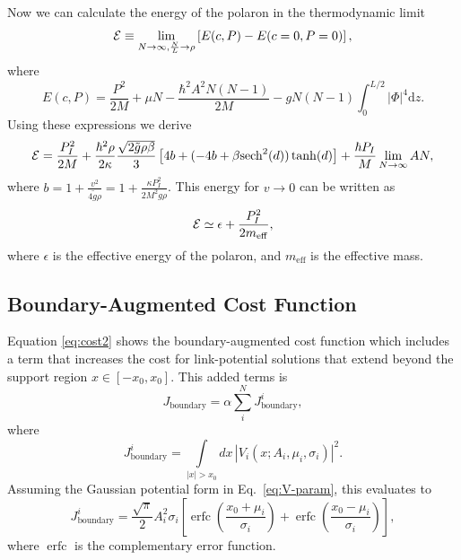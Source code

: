 \documentclass[twocolumn,amsmath,amssymb,showpacs,prl,superscriptaddress,aps]{revtex4-1}
\DeclareMathOperator\erfc{erfc}
\begin{document}
Now we can calculate the energy of the polaron in the thermodynamic limit
\begin{equation}
{\cal E}\equiv \lim_{N\to\infty, \frac{N}{L}\to \rho}\left[E(c,P)-E(c=0,P=0)\right],
\end{equation}
where
\begin{equation}
E(c,P) = \frac{P^2}{2M} + \mu N-\frac{\hbar^2 A^2 N(N-1)}{2M}-gN(N-1)\int_{0}^{L/2}|\Phi|^4\mathrm{d}z.
\end{equation}
Using these expressions we derive 
\begin{equation}
{\cal E}=\frac{P_I^2}{2M}+\frac{\hbar^2\rho}{2\kappa}\frac{\sqrt{2 \tilde g \rho \beta}}{3}\left[4 b + (-4b+\beta\mathrm{sech}^2(d))\tanh(d)\right]+\frac{\hbar P_I}{M}\lim_{N\to\infty} A N,
\end{equation}
where $b=1+\frac{v^2}{4\tilde g\rho}=1+\frac{\kappa P_I^2}{2M^2 g\rho}$. This energy for $v\to 0$ can be written as 
\begin{equation}
{\cal E}\simeq \epsilon+ \frac{P_I^2}{2m_{\mathrm{\mathrm{eff}}}},
\end{equation}
where $\epsilon$ is the effective energy of the polaron, and $m_{\mathrm{eff}}$ is the effective mass.





\subsection{Boundary-Augmented Cost Function}\label{sec:Jaug}
Equation \eqref{eq:cost2} shows the boundary-augmented cost function which includes a term that increases the cost for link-potential solutions that extend beyond the support region $x\in[-x_0,x_0]$. This added terms is
\begin{equation}
  J_{\mathrm{boundary}} = \alpha \sum_i^N J_{\mathrm{boundary}}^i,
\end{equation}
where 
\begin{equation}\label{eq:Jboundaryi}
  J_{\mathrm{boundary}}^i = \int\limits_{|x|>x_0}dx\,|V_i(x; A_i,\mu_i,\sigma_i)|^2.
\end{equation}
Assuming the Gaussian potential form in Eq.~\eqref{eq:V-param}, this evaluates to
\begin{equation}\label{eq:JboundaryIGaussian}
  J_{\mathrm{boundary}}^i = \frac{\sqrt{\pi}}{2}A_i^2\sigma_i\left[
    \erfc\left(\frac{x_0+\mu_i}{\sigma_i}\right) +
    \erfc\left(\frac{x_0-\mu_i}{\sigma_i}\right)
  \right],
\end{equation}
where $\erfc$ is the complementary error function.





 
\end{document}
